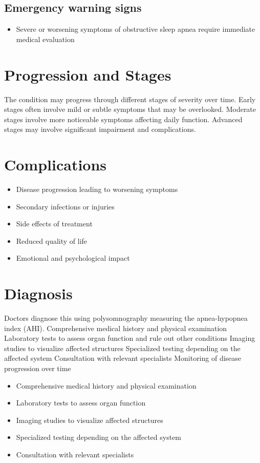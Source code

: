 \subsection{Emergency warning signs}
\begin{itemize}[noitemsep]
  \item Severe or worsening symptoms of obstructive sleep apnea require immediate medical evaluation
\end{itemize}
\section{Progression and Stages}
The condition may progress through different stages of severity over time. Early stages often involve mild or subtle symptoms that may be overlooked. Moderate stages involve more noticeable symptoms affecting daily function. Advanced stages may involve significant impairment and complications.
\section{Complications}
\begin{itemize}[noitemsep]
  \item Disease progression leading to worsening symptoms
  \item Secondary infections or injuries
  \item Side effects of treatment
  \item Reduced quality of life
  \item Emotional and psychological impact
\end{itemize}
\section{Diagnosis}
Doctors diagnose this using polysomnography measuring the apnea-hypopnea index (AHI). Comprehensive medical history and physical examination Laboratory tests to assess organ function and rule out other conditions Imaging studies to visualize affected structures Specialized testing depending on the affected system Consultation with relevant specialists Monitoring of disease progression over time

\begin{itemize}[noitemsep]
  \item Comprehensive medical history and physical examination
  \item Laboratory tests to assess organ function
  \item Imaging studies to visualize affected structures
  \item Specialized testing depending on the affected system
  \item Consultation with relevant specialists
\end{itemize}

